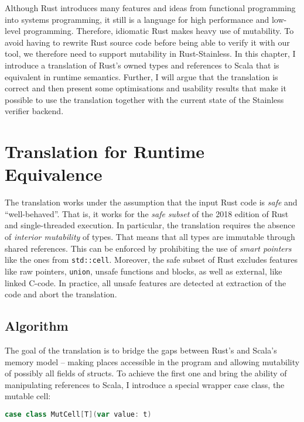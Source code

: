 Although Rust introduces many features and ideas from functional programming
into systems programming, it still is a language for high performance and
low-level programming. Therefore, idiomatic Rust makes heavy use of mutability.
To avoid having to rewrite Rust source code before being able to verify it with
our tool, we therefore need to support mutability in Rust-Stainless. In this
chapter, I introduce a translation of Rust's owned types and references to Scala
that is equivalent in runtime semantics. Further, I will argue that the
translation is correct and then present some optimisations and usability results
that make it possible to use the translation together with the current state of
the Stainless verifier backend.

\section{Translation for Runtime Equivalence}
\label{sec:translation}

The translation works under the assumption that the input Rust code is
\emph{safe} and ``well-behaved''. That is, it works for the \emph{safe subset}
\cite[section ``Unsafety'']{rustref} of the 2018 edition of Rust and
single-threaded execution. In particular, the translation requires the absence
of \emph{interior mutability} \cite[section ``Interior Mutability'']{rustref} of
types. That means that all types are immutable through shared references. This
can be enforced by prohibiting the use of \emph{smart pointers} like the ones
from \passthrough{\lstinline!std::cell!}. Moreover, the safe subset of Rust
excludes features like raw pointers, \passthrough{\lstinline!union!}, unsafe
functions and blocks, as well as external, like linked C-code. In practice, all
unsafe features are detected at extraction of the code and abort the
translation.


\subsection{Algorithm}

The goal of the translation is to bridge the gaps between Rust's and Scala's
memory model -- making places accessible in the program and allowing mutability
of possibly all fields of structs. To achieve the first one and bring the
ability of manipulating references to Scala, I introduce a special wrapper case
class, the mutable cell:

\begin{lstlisting}[language=Scala, style=short]
case class MutCell[T](var value: t)
\end{lstlisting}

